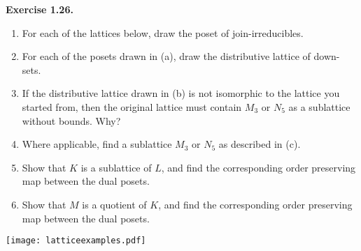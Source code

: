 

\usepackage[final]{pdfpages}
\usepackage{graphicx}



\thispagestyle{empty}
{\bf Exercise 1.26.}
\begin{enumerate}
\item For each of the lattices below, draw the poset of join-irreducibles.

\item For each of the posets drawn in (a), draw the distributive lattice of down-sets.

\item If the distributive lattice drawn in (b) is not isomorphic to the lattice you started from, then the original lattice must contain $M_3$ or $N_5$ as a sublattice without bounds. Why? 

\item Where applicable, find a sublattice $M_3$ or $N_5$ as described in (c).

\item Show that $K$ is a sublattice of $L$, and find the corresponding order preserving map between the dual posets.

\item Show that $M$ is a quotient of $K$, and find the corresponding order preserving map between the dual posets.
\end{enumerate}

\texttt{[image: latticeexamples.pdf]}


